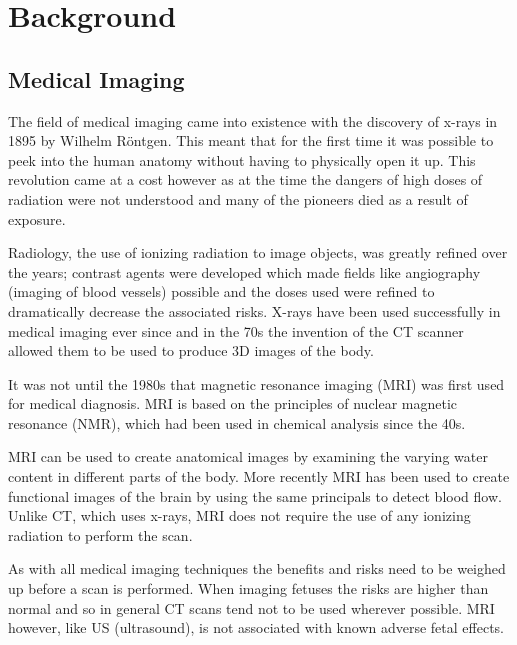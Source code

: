 \chapter{Background}

\section{Medical Imaging}\label{background:medicalimaging}
The field of medical imaging came into existence with the discovery of x-rays in 1895 by Wilhelm R\"{o}ntgen\cite{rontgen}. This meant that for the first time it was possible to peek into the human anatomy without having to physically open it up. This revolution came at a cost however as at the time the dangers of high doses of radiation were not understood and many of the pioneers died as a result of exposure\cite{xraydeath}.

Radiology, the use of ionizing radiation to image objects, was greatly refined over the years; contrast agents were developed which made fields like angiography (imaging of blood vessels) possible\cite{infinityhistory} and the doses used were refined to dramatically decrease the associated risks. X-rays have been used successfully in medical imaging ever since and in the 70s the invention of the CT scanner allowed them to be used to produce 3D images of the body.

It was not until the 1980s that magnetic resonance imaging (MRI) was first used for medical diagnosis. MRI is based on the principles of nuclear magnetic resonance (NMR), which had been used in chemical analysis since the 40s\cite{bshr:mallard}.

MRI can be used to create anatomical images by examining the varying water content in different parts of the body. More recently MRI has been used to create functional images of the brain by using the same principals to detect blood flow\cite{fmri}. Unlike CT, which uses x-rays, MRI does not require the use of any ionizing radiation to perform the scan.

As with all medical imaging techniques the benefits and risks need to be weighed up before a scan is performed. When imaging fetuses the risks are higher than normal and so in general CT scans tend not to be used wherever possible. MRI however, like US (ultrasound), is not associated with known adverse fetal effects\cite{pregnancyimagingguidelines}.

\newpage
